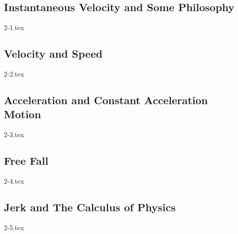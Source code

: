 \subsection{Instantaneous Velocity and Some Philosophy}

{2-1.tex}

\subsection{Velocity and Speed}

{2-2.tex}

\subsection{Acceleration and Constant Acceleration Motion}

{2-3.tex}

\subsection{Free Fall}

{2-4.tex}

\subsection{Jerk and The Calculus of Physics}

{2-5.tex}